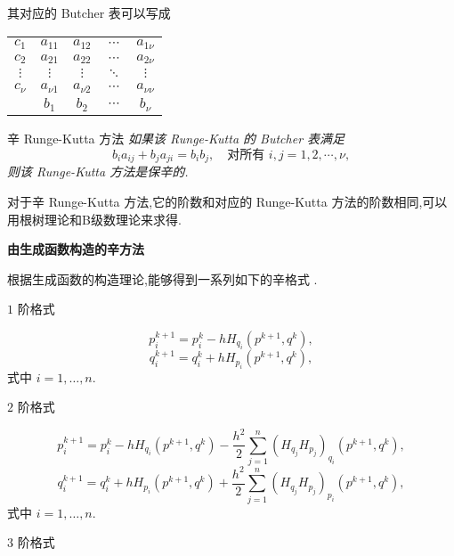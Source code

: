 其对应的 Butcher 表可以写成

\begin{center}
  \begin{tabular}{c|cccc}
    $c_1$&$a_{11}$&$a_{12}$&$\cdots$&$a_{1\nu}$\\
    $c_2$&$a_{21}$&$a_{22}$&$\cdots$&$a_{2\nu}$\\
    $\vdots$&$\vdots$&$\vdots$&$\ddots$&$\vdots$\\
    $c_{\nu}$&$a_{\nu 1}$&$a_{\nu 2}$&$\cdots$&$a_{\nu \nu}$\\
    \hline
         &$b_{1}$&$b_{2}$&$\cdots$&$b_{\nu}$
  \end{tabular}
\end{center}

\begin{theorem}{辛 Runge-Kutta 方法\cite{sanz1988runge}}
\emph{如果该 Runge-Kutta 的 Butcher 表满足
\begin{equation*}
  b_ia_{ij}+b_ja_{ji}=b_ib_j,\quad \textrm{对所有}\,\, i,j=1,2,\cdots,\nu,
\end{equation*}
则该 Runge-Kutta 方法是保辛的.}
\end{theorem}

对于辛 Runge-Kutta 方法,它的阶数和对应的 Runge-Kutta 方法的阶数相同,可以用根树理论和B级数理论来求得.

\noindent \textbf{由生成函数构造的辛方法}

根据生成函数的构造理论,能够得到一系列如下的辛格式 \cite{feng2003sym}.

$1$ 阶格式

\begin{equation*}
	p_i^{k+1}= p_i^{k}-hH_{q_i}(p^{k+1},q^{k}),
\end{equation*}
\begin{equation*}
	q_i^{k+1}= q_i^{k}+hH_{p_i}(p^{k+1},q^{k}),
\end{equation*}
式中 $i=1,\ldots,n$.

$2$ 阶格式

\begin{equation*}
	p_i^{k+1}= p_i^{k}-hH_{q_i}(p^{k+1},q^{k})-\frac{h^2}{2}\sum_{j=1}^n(H_{q_j}H_{p_j})_{q_i}(p^{k+1},q^{k}),
\end{equation*}
\begin{equation*}
	q_i^{k+1}= q_i^{k}+hH_{p_i}(p^{k+1},q^{k})+\frac{h^2}{2}\sum_{j=1}^n(H_{q_j}H_{p_j})_{p_i}(p^{k+1},q^{k}),
\end{equation*}
式中 $i=1,\ldots,n$.

$3$ 阶格式

